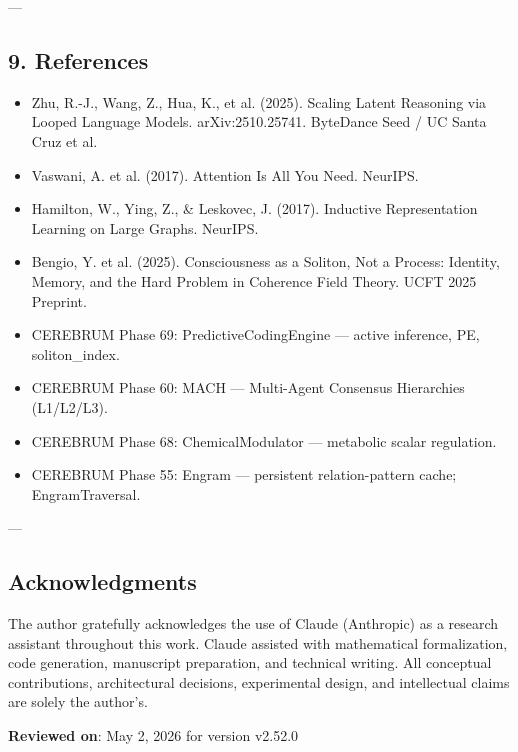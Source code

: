 ---

\subsection{9. References}

\begin{itemize}
\item [zhu\-2025\-loooplm] Zhu, R.-J., Wang, Z., Hua, K., et al. (2025). Scaling Latent Reasoning via Looped Language Models. arXiv:2510.25741. ByteDance Seed / UC Santa Cruz et al.
\item [vaswani\-2017\-attention] Vaswani, A. et al. (2017). Attention Is All You Need. NeurIPS.
\item [hamilton\-2017\-graphsage] Hamilton, W., Ying, Z., \& Leskovec, J. (2017). Inductive Repres\-entation Learning on Large Graphs. NeurIPS.
\item [bengio\-2025\-soliton] Bengio, Y. et al. (2025). Consci\-ousness as a Soliton, Not a Process: Identity, Memory, and the Hard Problem in Coherence Field Theory. UCFT 2025 Preprint.
\item [Phase 69] CEREBRUM Phase 69: PredictiveCodingEngine — active inference, PE, soliton\_index.
\item [Phase 60] CEREBRUM Phase 60: MACH — Multi-Agent Consensus Hierarchies (L1/L2/L3).
\item [Phase 68] CEREBRUM Phase 68: ChemicalModulator — metabolic scalar regulation.
\item [Phase 55] CEREBRUM Phase 55: Engram — persistent relation-pattern cache; EngramTraversal.

\end{itemize}
---
\subsection{Acknow\-ledgments}

The author gratefully ackno\-wledges the use of Claude (Anthropic) as a research assistant throughout this work. Claude assisted with mathe\-matical forma\-lization, code generation, manuscript preparation, and technical writing. All conceptual contr\-ibutions, archi\-tectural decisions, exper\-imental design, and intel\-lectual claims are solely the author's.

\textbf{Reviewed on}: May 2, 2026 for version v2.52.0
